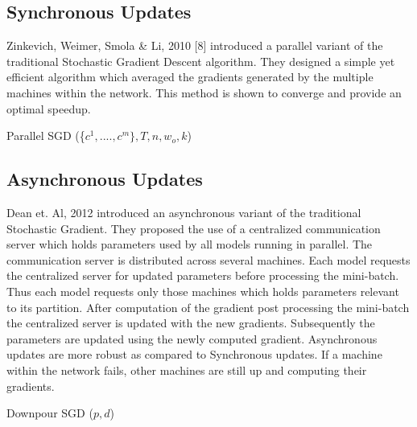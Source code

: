 \documentclass[sigconf]{acmart}
\begin{document}
\subsection{Synchronous Updates}

Zinkevich, Weimer,  Smola \& Li, 2010 [8] introduced a parallel variant of the traditional Stochastic Gradient Descent algorithm.  They designed a simple yet efficient algorithm which averaged the gradients generated by the multiple machines within the network. This method is shown to converge and provide an optimal speedup.

\begin{algorithm}

\caption{Parallel SGD (\{$ c^1,....,c^m\} , T, n, w_o,k$)}\label{SGD}

\begin{algorithmic}[1]

\EndFor
{}
\end{algorithmic}

\end{algorithm}


\subsection{Asynchronous Updates}

Dean et. Al, 2012 \cite{Dean:2012:LSD:2999134.2999271} introduced an asynchronous variant of the traditional Stochastic Gradient. They proposed the use of a centralized communication server which holds parameters used by all models running in parallel. The communication server is distributed across several machines. Each model requests the centralized server for updated parameters before processing the mini-batch. Thus each model requests only those machines which holds parameters relevant to its partition. After computation of the gradient post processing the mini-batch the centralized server is updated with the new gradients. Subsequently the parameters are updated using the newly computed gradient. Asynchronous updates are more robust as compared to Synchronous updates. If a machine within the network fails, other machines are still up and computing their gradients.  

\begin{algorithm}

\caption{Downpour SGD ($p,d$)}\label{DownpourSGD}

\begin{algorithmic}[1]

\EndFor
\end{algorithmic}

\end{algorithm}
\end{document}

